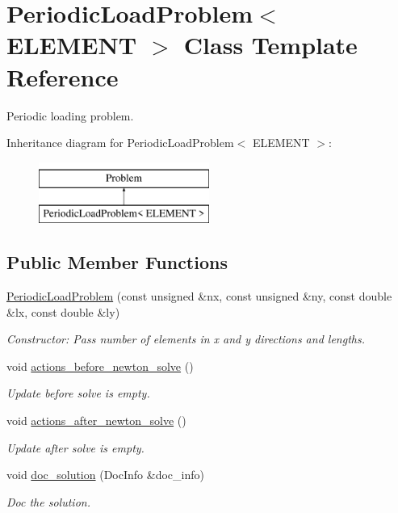 \hypertarget{classPeriodicLoadProblem}{}\section{Periodic\+Load\+Problem$<$ E\+L\+E\+M\+E\+NT $>$ Class Template Reference}
\label{classPeriodicLoadProblem}


Periodic loading problem.  


Inheritance diagram for Periodic\+Load\+Problem$<$ E\+L\+E\+M\+E\+NT $>$\+:\begin{figure}[H]
\begin{center}
\leavevmode
\includegraphics[height=2.000000cm]{classPeriodicLoadProblem}
\end{center}
\end{figure}
\subsection*{Public Member Functions}
\begin{DoxyCompactItemize}
\item 
\hyperlink{classPeriodicLoadProblem_a66bf36608f2068374c09c73d9256edda}{Periodic\+Load\+Problem} (const unsigned \&nx, const unsigned \&ny, const double \&lx, const double \&ly)
\begin{DoxyCompactList}\small\item\em Constructor\+: Pass number of elements in x and y directions and lengths. \end{DoxyCompactList}\item 
void \hyperlink{classPeriodicLoadProblem_aad83601d810e4cc135f83c1308a0449b}{actions\+\_\+before\+\_\+newton\+\_\+solve} ()
\begin{DoxyCompactList}\small\item\em Update before solve is empty. \end{DoxyCompactList}\item 
void \hyperlink{classPeriodicLoadProblem_aad99d153549e1ec0b5504e486039ef5e}{actions\+\_\+after\+\_\+newton\+\_\+solve} ()
\begin{DoxyCompactList}\small\item\em Update after solve is empty. \end{DoxyCompactList}\item 
void \hyperlink{classPeriodicLoadProblem_ad414cf9a0b4a61de439e459f10e762c7}{doc\+\_\+solution} (Doc\+Info \&doc\+\_\+info)
\begin{DoxyCompactList}\small\item\em Doc the solution. \end{DoxyCompactList}\end{DoxyCompactItemize}
